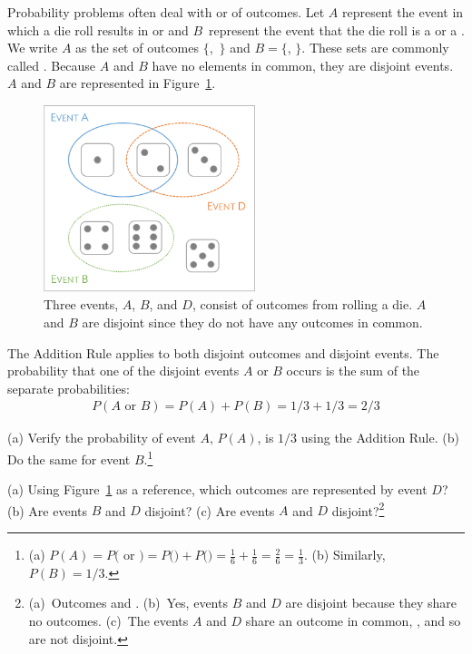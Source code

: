 Probability problems often deal with  or  of outcomes. Let $A$ represent the event in which a die roll results in  or  and $B$~represent the event that the die roll is a  or a . We write $A$ as the set of outcomes $\{$,~$\}$ and $B=\{$, $\}$. These sets are commonly called . Because $A$ and $B$ have no elements in common, they are disjoint events. $A$ and $B$ are represented in Figure~\ref{fig:disjointEvents}.

\begin{figure}[hhh]
\centering
\includegraphics[width=0.55\textwidth]{ch_probability_oi_biostat/figures/disjointEvents/disjointEvents.png}
\caption{Three events, $A$, $B$, and $D$, consist of outcomes from rolling a die. $A$ and $B$ are disjoint since they do not have any outcomes in common.}
\label{fig:disjointEvents}
\end{figure}

The Addition Rule applies to both disjoint outcomes and disjoint events. The probability that one of the disjoint events $A$ or $B$ occurs is the sum of the separate probabilities:
\begin{align*}
P(A\text{ or }B) = P(A) + P(B) = 1/3 + 1/3 = 2/3
\end{align*}

\begin{exercise}
(a) Verify the probability of event $A$, $P(A)$, is $1/3$ using the Addition Rule. (b) Do the same for event $B$.\footnote{(a) $P(A) = P($ or $) = P($$) + P($$) = \frac{1}{6} + \frac{1}{6} = \frac{2}{6} = \frac{1}{3}$. (b) Similarly, $P(B) = 1/3$.}
\end{exercise}

\begin{exercise} \label{exerExaminingDisjointSetsABD}
(a) Using Figure~\ref{fig:disjointEvents} as a reference, which outcomes are represented by event $D$? (b) Are events $B$ and $D$ disjoint? (c) Are events $A$ and $D$ disjoint?\footnote{(a)~Outcomes  and . (b)~Yes, events $B$ and $D$ are disjoint because they share no outcomes. (c)~The events $A$ and $D$ share an outcome in common, , and so are not disjoint.}
\end{exercise}

